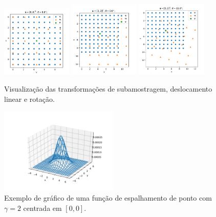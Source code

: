 \begin{figure}[h]
	\centering
	\caption{\label{fig:transformations}Visualização das transformações de subamostragem, deslocamento linear e rotação.}
	\includegraphics[width=0.3\textwidth]{./figures/transform1.pdf}
	\includegraphics[width=0.3\textwidth]{./figures/transform2.pdf}
	\includegraphics[width=0.3\textwidth]{./figures/transform3.pdf}
\end{figure}

\begin{figure}[H]
	\centering
	\caption{\label{fig:psfplot}Exemplo de gráfico de uma função de espalhamento de ponto com $\gamma = 2$ centrada em $[0,0]$.}
	\includegraphics[width = 0.5\textwidth]{./figures/psf1.pdf}
\end{figure}

